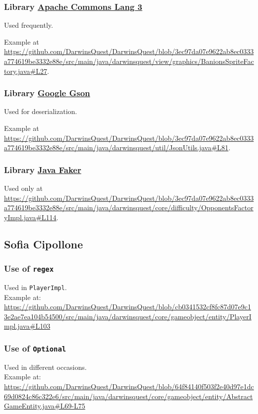 \documentclass[12pt, a4paper]{report}
\theoremstyle{definition}
\begin{document}
        \subsubsection{Library \href{https://commons.apache.org/proper/commons-lang/}{Apache Commons Lang 3}}
        
        Used frequently.

        Example at \url{https://github.com/DarwinsQuest/DarwinsQuest/blob/3ec97da07e9622ab8ec0333a774619be3332e88e/src/main/java/darwinsquest/view/graphics/BanionsSpriteFactory.java#L27}.
        
        \subsubsection{Library \href{https://github.com/google/gson}{Google Gson}}
        
        Used for deserialization.

        Example at \url{https://github.com/DarwinsQuest/DarwinsQuest/blob/3ec97da07e9622ab8ec0333a774619be3332e88e/src/main/java/darwinsquest/util/JsonUtils.java#L81}.
        
        \subsubsection{Library \href{https://github.com/DiUS/java-faker}{Java Faker}}
        
        Used only at \url{https://github.com/DarwinsQuest/DarwinsQuest/blob/3ec97da07e9622ab8ec0333a774619be3332e88e/src/main/java/darwinsquest/core/difficulty/OpponentsFactoryImpl.java#L114}.

    \subsection*{Sofia Cipollone}

    \subsubsection{Use of \texttt{regex}}
    Used in \verb|PlayerImpl|.\\
    Example at: \url{https://github.com/DarwinsQuest/DarwinsQuest/blob/cb0341532cf8fc87d07e9c13e2ae7ea104b54500/src/main/java/darwinsquest/core/gameobject/entity/PlayerImpl.java#L103}

    \subsubsection{Use of \texttt{Optional}}
    Used in different occasions.\\
    Example at: \url{https://github.com/DarwinsQuest/DarwinsQuest/blob/64f84140f503f2e40d97e1dc69d0824c86c322e6/src/main/java/darwinsquest/core/gameobject/entity/AbstractGameEntity.java#L69-L75}
\end{document}
